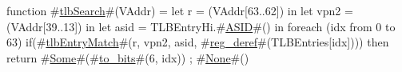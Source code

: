 function #\hyperref[ztlbSearch]{tlbSearch}#(VAddr) =
  let r    = (VAddr[63..62]) in
  let vpn2 = (VAddr[39..13]) in
  let asid = TLBEntryHi.#\hyperref[zASID]{ASID}#() in {
    foreach (idx from 0 to 63) {
      if(#\hyperref[ztlbEntryMatch]{tlbEntryMatch}#(r, vpn2, asid, #\hyperref[zregzyderef]{reg\_deref}#(TLBEntries[idx]))) then
	return #\hyperref[zSome]{Some}#(#\hyperref[ztozybits]{to\_bits}#(6, idx))
    };
    #\hyperref[zNone]{None}#()
  }
